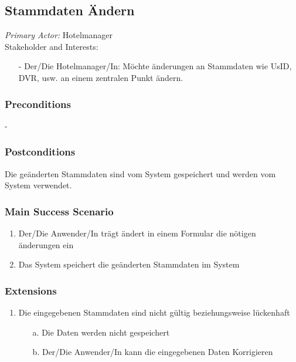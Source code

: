 \documentclass[./detailed_overview_usecases.tex]{subfiles}
\begin{document}
    \subsection{Stammdaten Ändern}
    \textit{Primary Actor:}
    Hotelmanager
    \\
    Stakeholder and Interests:
    \begin{itemize}
        \item[-] Der/Die Hotelmanager/In: Möchte änderungen an Stammdaten wie UsID, DVR, usw. an  einem zentralen Punkt ändern.
    \end{itemize}

    \subsubsection*{Preconditions}
    -
    \subsubsection*{Postconditions}
    Die geänderten Stammdaten sind vom System gespeichert und werden vom System verwendet.

    \subsubsection*{Main Success Scenario}
    \begin{enumerate}
        \item Der/Die Anwender/In trägt ändert in einem Formular die nötigen änderungen ein
        \item Das System speichert die geänderten Stammdaten im System
    \end{enumerate}

    \subsubsection*{Extensions}
    \begin{enumerate}
        \item Die eingegebenen Stammdaten sind nicht gültig beziehungsweise lückenhaft
        \begin{itemize}
            \item[a.] Die Daten werden nicht gespeichert
            \item[b.] Der/Die Anwender/In kann die eingegebenen Daten Korrigieren
        \end{itemize}
    \end{enumerate}
\end{document}
